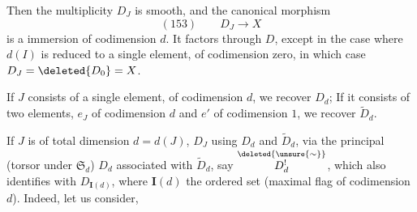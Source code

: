 
Then the multiplicity $D_J$ is smooth,  and the canonical morphism
\[
(153)\qquad D_J\longrightarrow X
\]
is a  immersion of codimension $d$.
It factors through $D$, except in the case where $d(I)$ is reduced to a single element, of codimension zero, in which case $D_J=\deleted{D_0}=X$.

If $J$ consists of a single element, of codimension $d$, we recover $D_d$; If it consists of two elements,  $e_J$ of codimension $d$ and $e'$ of codimension $1$, we recover $\widetilde D_d$.

If $J$ is of total dimension $d=d(J)$,    $D_J$ using $D_d$ and $\widetilde D_d$, via the principal  (torsor under $\mathfrak S_d$)  $D_d$ associated with $\widetilde D_d$, say $\overset{\deleted{\unsure{\sim}}}{D^!_d}$, which also identifies with $D_{\mathbf I(d)}$, where $\mathbf I(d)$ the ordered set
(maximal flag of codimension $d$). Indeed, let us consider,

